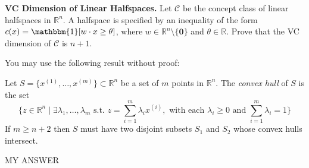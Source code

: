 \documentclass[11pt]{article}
\newcommand*{\C}{{\mathcal C}}
\newcommand*{\R}{\mathbb{R}}
\DeclareMathOperator{\1}{\mathbbm{1}}
\begin{document}
\begin{problem} [15pts] \textbf{VC Dimension of Linear Halfspaces.}
	Let $\C$ be the concept class of linear halfspaces in $\R^n$. A halfspace is specified by an inequality of the form $c(x) = \1[w \cdot x \geq \theta]$, where $w \in \R^n\setminus\{\mathbf{0}\}$ and $\theta \in \R$. Prove that the VC dimension of $\C$ is $n+1$.
\end{problem}
\begin{note}
	You may use the following result without proof:
	\begin{theorem}
		Let $S =
		\{x^{(1)},\dots,x^{(m)}\} \subset \R^n$ be a set of $m$
		points in $\R^n.$  The {\em convex hull} of $S$ is the set
		\[
		\{ z \in \R^n \mid \exists \lambda_1,\ldots,\lambda_m \text{\ s.t.\ } z = \sum_{i=1}^m \lambda_i x^{(i)}, \text{\ with each\ }\lambda_i \geq 0 \text{\ and\ } \sum_{i=1}^m \lambda_i = 1\}
		\] 
		If $m \geq n+2$ then $S$ must have two disjoint subsets
		$S_1$ and $S_2$ whose convex hulls intersect.
	\end{theorem}
\end{note}

MY ANSWER
\end{document}

